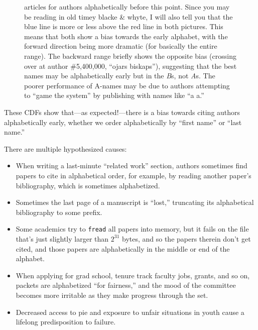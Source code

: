 \documentclass[twocolumn]{article}
\begin{document}
\begin{figure}[t]
{    articles for authors alphabetically before this point. Since you
    may be reading in old timey blacke \& whyte, I will also tell you
    that the blue line is more or less above the red line in both
    pictures. This means that both show a bias towards the early
    alphabet, with the forward direction being more dramatic (for
    basically the entire range). The backward range briefly shows the
    opposite bias (crossing over at author \#5,400,000, ``ojars
    biskaps''), suggesting that the best names may be alphabetically
    early but in the {\em B}s, not {\em A}s. The poorer performance of
    A-names may be due to authors attempting to ``game the system'' by
    publishing with names like ``a a.'' } \label{fig:authorcdf}
\end{figure}

These CDFs show that---as expected!---there is a bias towards citing
authors alphabetically early, whether we order alphabetically by
``first name'' or ``last name.''

There are multiple hypothesized causes:
\begin{itemize}

\item When writing a last-minute ``related work'' section, authors
  sometimes find papers to cite in alphabetical order, for example, by
  reading another paper's bibliography, which is sometimes
  alphabetized.

\item Sometimes the last page of a manuscript is ``lost,'' truncating
  its alphabetical bibliography to some prefix.

\item Some academics try to \verb+fread+ all papers into memory, but
  it fails on the file that's just slightly larger than $2^{31}$ bytes,
  and so the papers therein don't get cited, and those papers are
  alphabetically in the middle or end of the alphabet.

\item When applying for grad school, tenure track faculty jobs, grants,
  and so on, packets are alphabetized ``for fairness,'' and the
  mood of the committee becomes more irritable as they make
  progress through the set.

\item Decreased access to pie and exposure to unfair situations in
  youth cause a lifelong predisposition to failure.

\end{itemize}
\end{document}
